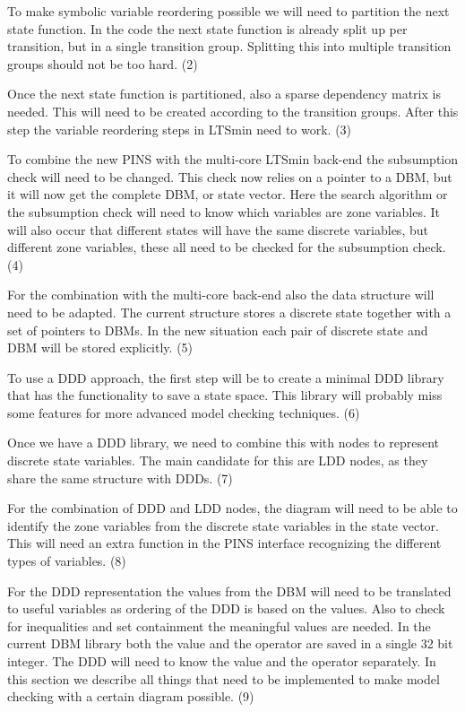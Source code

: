 To make symbolic variable reordering possible we will need to partition the next state function. In the code the next state function is already split up per transition, but in a single transition group. Splitting this into multiple transition groups should not be too hard. (2)

Once the next state function is partitioned, also a sparse dependency matrix is needed. This will need to be created according to the transition groups. After this step the variable reordering steps in LTSmin need to work. (3)

To combine the new PINS with the multi-core LTSmin back-end the subsumption check will need to be changed. This check now relies on a pointer to a DBM, but it will now get the complete DBM, or state vector. Here the search algorithm or the subsumption check will need to know which variables are zone variables. It will also occur that different states will have the same discrete variables, but different zone variables, these all need to be checked for the subsumption check. (4)

For the combination with the multi-core back-end also the data structure will need to be adapted. The current structure stores a discrete state together with a set of pointers to DBMs. In the new situation each pair of discrete state and DBM will be stored explicitly. (5)

To use a DDD approach, the first step will be to create a minimal DDD library that has the functionality to save a state space. This library will probably miss some features for more advanced model checking techniques. (6)

Once we have a DDD library, we need to combine this with nodes to represent discrete state variables. The main candidate for this are LDD nodes, as they share the same structure with DDDs. (7)

For the combination of DDD and LDD nodes, the diagram will need to be able to identify the zone variables from the discrete state variables in the state vector. This will need an extra function in the PINS interface recognizing the different types of variables. (8)

For the DDD representation the values from the DBM will need to be translated to useful variables as ordering of the DDD is based on the values. Also to check for inequalities and set containment the meaningful values are needed. In the current DBM library both the value and the operator are saved in a single 32 bit integer. The DDD will need to know the value and the operator separately.
In this section we describe all things that need to be implemented to make model checking with a certain diagram possible. (9)

